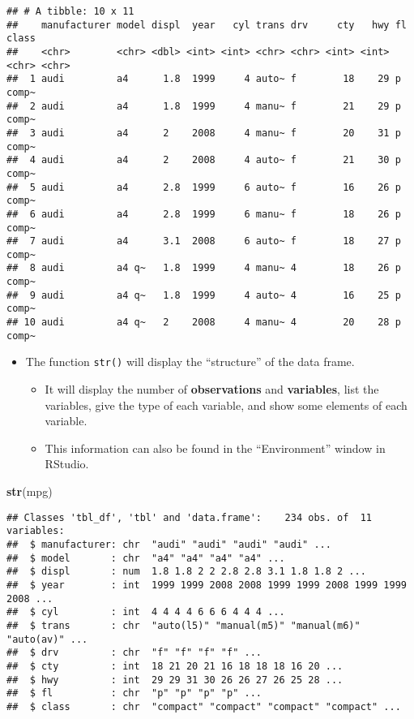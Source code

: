 \documentclass[]{book}
\newenvironment{Shaded}{\begin{snugshade}}{\end{snugshade}}
\newcommand{\KeywordTok}[1]{\textcolor[rgb]{0.13,0.29,0.53}{\textbf{#1}}}
\newcommand{\NormalTok}[1]{#1}
\providecommand{\tightlist}{%
  \setlength{\itemsep}{0pt}\setlength{\parskip}{0pt}}
\begin{document}
\begin{verbatim}
## # A tibble: 10 x 11
##    manufacturer model displ  year   cyl trans drv     cty   hwy fl    class
##    <chr>        <chr> <dbl> <int> <int> <chr> <chr> <int> <int> <chr> <chr>
##  1 audi         a4      1.8  1999     4 auto~ f        18    29 p     comp~
##  2 audi         a4      1.8  1999     4 manu~ f        21    29 p     comp~
##  3 audi         a4      2    2008     4 manu~ f        20    31 p     comp~
##  4 audi         a4      2    2008     4 auto~ f        21    30 p     comp~
##  5 audi         a4      2.8  1999     6 auto~ f        16    26 p     comp~
##  6 audi         a4      2.8  1999     6 manu~ f        18    26 p     comp~
##  7 audi         a4      3.1  2008     6 auto~ f        18    27 p     comp~
##  8 audi         a4 q~   1.8  1999     4 manu~ 4        18    26 p     comp~
##  9 audi         a4 q~   1.8  1999     4 auto~ 4        16    25 p     comp~
## 10 audi         a4 q~   2    2008     4 manu~ 4        20    28 p     comp~
\end{verbatim}

\begin{itemize}
\tightlist
\item
  The function \texttt{str()} will display the ``structure'' of the data frame.

  \begin{itemize}
  \tightlist
  \item
    It will display the number of \textbf{observations} and \textbf{variables}, list the variables, give the type of each variable, and show some elements of each variable.
  \item
    This information can also be found in the ``Environment'' window in RStudio.
  \end{itemize}
\end{itemize}

\begin{Shaded}
\begin{Highlighting}[]
\KeywordTok{str}\NormalTok{(mpg)}
\end{Highlighting}
\end{Shaded}

\begin{verbatim}
## Classes 'tbl_df', 'tbl' and 'data.frame':    234 obs. of  11 variables:
##  $ manufacturer: chr  "audi" "audi" "audi" "audi" ...
##  $ model       : chr  "a4" "a4" "a4" "a4" ...
##  $ displ       : num  1.8 1.8 2 2 2.8 2.8 3.1 1.8 1.8 2 ...
##  $ year        : int  1999 1999 2008 2008 1999 1999 2008 1999 1999 2008 ...
##  $ cyl         : int  4 4 4 4 6 6 6 4 4 4 ...
##  $ trans       : chr  "auto(l5)" "manual(m5)" "manual(m6)" "auto(av)" ...
##  $ drv         : chr  "f" "f" "f" "f" ...
##  $ cty         : int  18 21 20 21 16 18 18 18 16 20 ...
##  $ hwy         : int  29 29 31 30 26 26 27 26 25 28 ...
##  $ fl          : chr  "p" "p" "p" "p" ...
##  $ class       : chr  "compact" "compact" "compact" "compact" ...
\end{verbatim}
\end{document}
